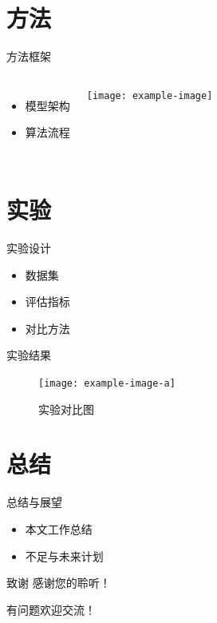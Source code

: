 \documentclass[aspectratio=169]{beamer}  %
\begin{document}
\section{方法}
\begin{frame}{方法框架}
  \begin{columns}
      \begin{itemize}
        \item 模型架构
        \item 算法流程
      \end{itemize}
      \texttt{[image: example-image]}
  \end{columns}
\end{frame}

\section{实验}
\begin{frame}{实验设计}
  \begin{itemize}
    \item 数据集
    \item 评估指标
    \item 对比方法
  \end{itemize}
\end{frame}

\begin{frame}{实验结果}
  \begin{figure}
    \texttt{[image: example-image-a]}
    \caption{实验对比图}
  \end{figure}
\end{frame}

\section{总结}
\begin{frame}{总结与展望}
  \begin{itemize}
    \item 本文工作总结
    \item 不足与未来计划
  \end{itemize}
\end{frame}

\begin{frame}{致谢}
  \centering
  感谢您的聆听！\par
  \vspace{1cm}
  有问题欢迎交流！
\end{frame}
\end{document}
